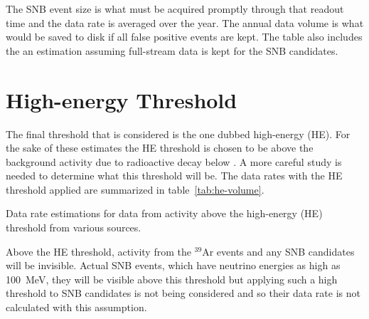The SNB event size is what must be acquired promptly through that
readout time and the data rate is averaged over the year.
The annual data volume is what would be saved to disk if all false
positive events are kept.
The table also includes the an estimation assuming full-stream data is
kept for the SNB candidates.

\section{High-energy Threshold}

The final threshold that is considered is the one dubbed high-energy (HE).
For the sake of these estimates the HE threshold is chosen to be above
the background activity due to radioactive decay below \chargehethreshold.
A more careful study is needed to determine what this threshold will be.
The data rates with the HE threshold applied are summarized in table~\ref{tab:he-volume}.

\begin{table}[htbp]
  \centering
  \caption{Data rate estimations for data from activity above the
    high-energy (HE) threshold from various sources.}
  
  \label{tab:he-volume}
\end{table}

Above the HE threshold, activity from the $^{39}$Ar events and any SNB
candidates will be invisible.
Actual SNB events, which have neutrino energies as high as
\SI{100}{\MeV}, they will be visible above this threshold but applying
such a high threshold to SNB candidates is not being considered and so
their data rate is not calculated with this assumption.




